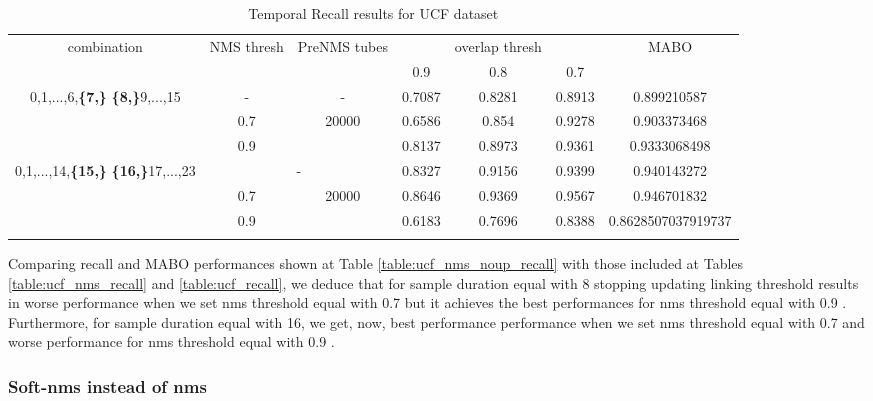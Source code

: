 \begin{center}
  \setlength{\tabcolsep}{2.2pt}
\begin{longtable}{||c | c | c | c c c| c|}

  \hline
  \multirow{2}{*}{combination} & \multirow{2}{2.5em}{NMS thresh} & \multirow{2}{3.5em}{PreNMS tubes} &  {} &overlap thresh & {} & \multirow{2}{*}{MABO} \\
  {} & {} & {} &  0.9 &  0.8 & 0.7 & {}\\         
  \hline

  \multirow{3}{7em}{0,1,...,6,\textbf{\{7,\}}
    \textbf{\{8,\}}9,...,15 }  &   -   & -    & 0.7087 & 0.8281 & 0.8913 & 0.899210587 \\
  \cline{2-7} 
  {} & 0.7 &\multirow{2}{*}{20000}  & 0.6586 & 0.854 & 0.9278 & 0.903373468 \\
  \cline{2-2} \cline{4-7} 
  {} &  0.9   & {}   &  0.8137 & 0.8973 & 0.9361 & 0.9333068498 \\
  \hline                                    
  \multirow{3}{7em}{0,1,...,14,\textbf{\{15,\}}
  \textbf{\{16,\}}17,...,23 }  &   \multicolumn{2}{|c|}{-} & 0.8327 & 0.9156 &0.9399 & 0.940143272 \\
  \cline{2-7}
  {} & 0.7 & \multirow{2}{*}{20000}& 0.8646 & 0.9369 & 0.9567 & 0.946701832 \\
  \cline{2-2} \cline{4-7} 
  {} &  0.9   & {}   & 0.6183 & 0.7696 & 0.8388 & 0.8628507037919737 \\
  \hline                                    

  \caption{Temporal Recall results for UCF dataset}
  \label{table:ucf_nms_noup_temp_recall}
\end{longtable} 
\end{center}

Comparing recall and MABO performances shown at Table \ref{table:ucf_nms_noup_recall} with those included at Tables \ref{table:ucf_nms_recall}
and \ref{table:ucf_recall}, we deduce that for sample duration equal with 8 stopping updating linking threshold results in worse performance
when we set nms threshold equal with 0.7 but it achieves the best performances for nms threshold equal with 0.9 . Furthermore, for sample duration
equal with 16, we get, now,  best performance performance when we set nms threshold equal with 0.7 and worse performance for nms threshold equal with 0.9 .

\subsubsection{Soft-nms instead of nms}

